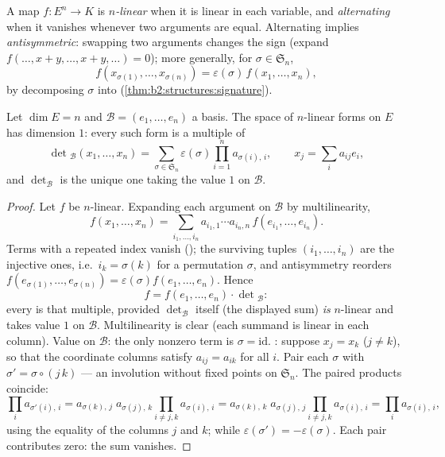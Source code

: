 \begin{definition}\label{def:b2:linalg:alternating}
A map $f \colon E^n \to K$ is \emph{$n$-linear} when it is linear in
each variable, and \emph{alternating} when
it vanishes whenever two arguments are equal. Alternating implies
\emph{antisymmetric}: swapping two arguments changes the sign
(expand $f(\dots, x + y, \dots, x + y, \dots) = 0$); more generally,
for $\sigma \in \mathfrak{S}_n$,
\[
f(x_{\sigma(1)}, \dots, x_{\sigma(n)}) =
\varepsilon(\sigma)\, f(x_1, \dots, x_n),
\]
by decomposing $\sigma$ into 
(\cref{thm:b2:structures:signature}).
\end{definition}

\begin{theorem}\label{thm:b2:linalg:detspace}
Let $\dim E = n$ and $\mathcal{B} = (e_1, \dots, e_n)$ a basis. The
space of  $n$-linear forms on $E$ has dimension $1$:
every such form is a multiple of
\[
\det{}_{\mathcal{B}}(x_1, \dots, x_n)
= \sum_{\sigma \in \mathfrak{S}_n} \varepsilon(\sigma)
\prod_{i=1}^{n} a_{\sigma(i),\,i},
\qquad
x_j = \sum_{i} a_{ij} e_i ,
\]
and $\det_{\mathcal{B}}$ is the unique one taking the value $1$ on
$\mathcal{B}$.
\end{theorem}

\begin{proof}
Let $f$ be  $n$-linear. Expanding each argument on
$\mathcal{B}$ by multilinearity,
\[
f(x_1, \dots, x_n)
= \sum_{i_1, \dots, i_n} a_{i_1,1}\cdots a_{i_n,n}\,
f(e_{i_1}, \dots, e_{i_n}).
\]
Terms with a repeated index vanish (); the surviving
tuples $(i_1, \dots, i_n)$ are the injective ones, i.e.\ $i_k =
\sigma(k)$ for a permutation $\sigma$, and antisymmetry reorders
$f(e_{\sigma(1)}, \dots, e_{\sigma(n)}) = \varepsilon(\sigma)
f(e_1, \dots, e_n)$. Hence
\[
f = f(e_1, \dots, e_n) \cdot \det{}_{\mathcal{B}} :
\]
every  is that multiple, provided
$\det_{\mathcal{B}}$ itself (the displayed sum) \emph{is}
 $n$-linear and takes value $1$ on $\mathcal B$.
Multilinearity is clear (each summand is linear in each column).
Value on $\mathcal B$: the only nonzero term is $\sigma =
\mathrm{id}$. : suppose $x_j = x_k$ ($j \neq k$), so
that the coordinate columns satisfy $a_{i j} = a_{i k}$ for all
$i$. Pair each $\sigma$ with $\sigma' = \sigma\circ(j\,k)$ ---
an involution without fixed points on $\mathfrak{S}_n$. The
paired products coincide:
\[
\prod_i a_{\sigma'(i),\,i}
= a_{\sigma(k),\,j}\; a_{\sigma(j),\,k}
\prod_{i \neq j,k} a_{\sigma(i),\,i}
= a_{\sigma(k),\,k}\; a_{\sigma(j),\,j}
\prod_{i \neq j,k} a_{\sigma(i),\,i}
= \prod_i a_{\sigma(i),\,i},
\]
using the equality of the columns $j$ and $k$; while
$\varepsilon(\sigma') = -\varepsilon(\sigma)$. Each pair
contributes zero: the sum vanishes.
\end{proof}

